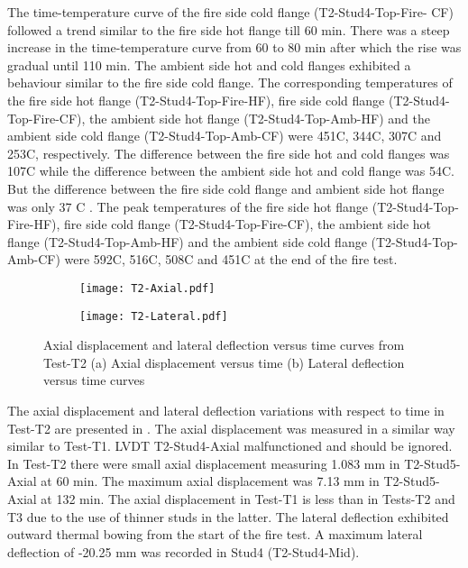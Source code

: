 The time-temperature curve of the fire side cold flange (T2-Stud4-Top-Fire- CF) followed a trend similar to the fire side hot flange till 60 min. There was a steep increase in the time-temperature curve from 60 to 80 min after which the rise was gradual until 110 min. The ambient side hot and cold flanges exhibited a behaviour similar to the fire side cold flange. The corresponding temperatures of the fire side hot flange (T2-Stud4-Top-Fire-HF), fire side cold flange (T2-Stud4-Top-Fire-CF), the ambient side hot flange (T2-Stud4-Top-Amb-HF) and the ambient side cold flange (T2-Stud4-Top-Amb-CF) were 451\degree C, 344\degree C, 307\degree C and 253\degree C, respectively. The difference between the fire side hot and cold flanges was 107\degree C while the difference between the ambient side hot and cold flange was 54\degree C. But the difference between the fire side cold flange and ambient side hot flange was only 37 \degree C . The peak temperatures of the fire side hot flange (T2-Stud4-Top-Fire-HF), fire side cold flange (T2-Stud4-Top-Fire-CF), the ambient side hot flange (T2-Stud4-Top-Amb-HF) and the ambient side cold flange (T2-Stud4-Top-Amb-CF) were 592\degree C, 516\degree C, 508\degree C and 451\degree C at the end of the fire test.
\begin{figure}[!htbp]
	\centering
	\begin{subfigure}[b]{0.7\textwidth}
		\centering
		\texttt{[image: T2-Axial.pdf]}
		\caption{}
		\label{subfig:T2-Axial}
	\end{subfigure}
	\begin{subfigure}[b]{0.7\textwidth}
		\centering
		\texttt{[image: T2-Lateral.pdf]}
		\caption{}
		\label{subfig:T2-Lateral}
	\end{subfigure}
	   \caption{Axial displacement and lateral deflection versus time curves from Test-T2 (a) Axial displacement versus time (b) Lateral deflection versus time curves}
	   \label{fig:T2-Axial-Lateral}
\end{figure}

The axial displacement and lateral deflection variations with respect to time in Test-T2 are presented in . The axial displacement was measured in a similar way similar to Test-T1. LVDT T2-Stud4-Axial malfunctioned and should be ignored. In Test-T2 there were small axial displacement measuring 1.083 mm in T2-Stud5-Axial at 60 min. The maximum axial displacement was 7.13 mm in T2-Stud5-Axial at 132 min. The axial displacement in Test-T1 is less than in Tests-T2 and T3 due to the use of thinner studs in the latter. The lateral deflection exhibited outward thermal bowing from the start of the fire test. A maximum lateral deflection of -20.25 mm was recorded in Stud4 (T2-Stud4-Mid). 

